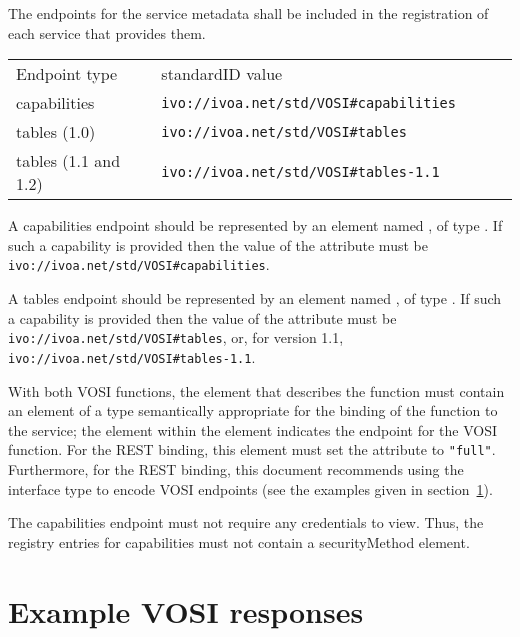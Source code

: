 \documentclass[11pt,letter]{ivoa}
\begin{document}
The endpoints for the service metadata shall be
included in the registration of each service that provides them.

\begin{tabular}{l l l l l}
\label{tab:registration}
Endpoint type & standardID value \\
capabilities & \nolinkurl{ivo://ivoa.net/std/VOSI#capabilities} \\
tables (1.0) & \nolinkurl{ivo://ivoa.net/std/VOSI#tables} \\
tables (1.1 and 1.2) & \nolinkurl{ivo://ivoa.net/std/VOSI#tables-1.1} \\
\end{tabular}

A capabilities endpoint should be represented by an element named
, of type
. If such a
capability is provided then the value of the 
attribute must be \nolinkurl{ivo://ivoa.net/std/VOSI#capabilities}.

A tables endpoint should be represented by an element named
, of type
. If such a
capability is provided then the value of the 
attribute must be \nolinkurl{ivo://ivoa.net/std/VOSI\#tables}, or, for
version 1.1, \nolinkurl{ivo://ivoa.net/std/VOSI\#tables-1.1}.

With both VOSI functions, the  element that
describes the function must contain an  element of a
type semantically appropriate for the binding of the function to the
service; the  element within the 
element indicates the endpoint for the VOSI function. For the REST
binding, this  element must set the 
attribute to \texttt{"full"}. Furthermore, for the REST binding, this
document recommends using the
 interface
type to encode VOSI endpoints (see the examples given in
section~\ref{sec:examples}). 

The capabilities endpoint must not require any
credentials to view.  Thus, the  registry entries for
capabilities must not contain a securityMethod element.

\section{Example VOSI responses}
\label{sec:examples}
\end{document}
